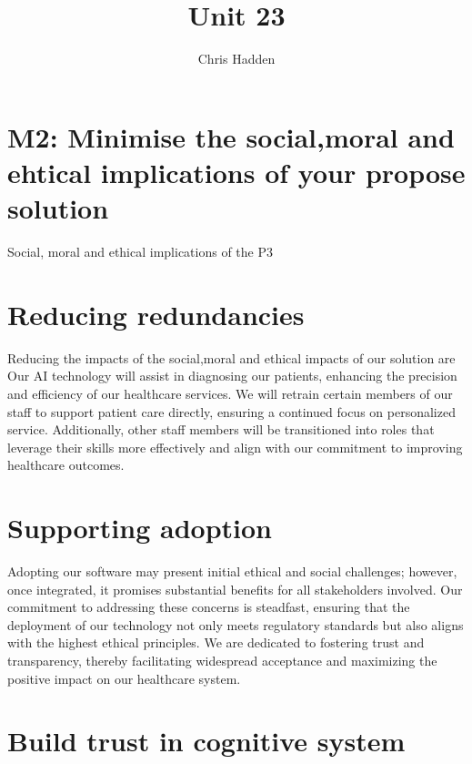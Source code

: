 \documentclass{article}
\title{Unit 23}
\author{Chris Hadden}
\date{}
\begin{document}
\maketitle

\section{M2: Minimise the social,moral and ehtical implications of your propose solution}

Social, moral and ethical implications of the P3

\section{Reducing redundancies}
Reducing the impacts of the social,moral and ethical impacts of our solution are  
Our AI technology will assist in diagnosing our patients, enhancing the precision and efficiency of our healthcare services. We will retrain certain members of our staff to support patient care directly, ensuring a continued focus on personalized service. Additionally, other staff members will be transitioned into roles that leverage their skills more effectively and align with our commitment to improving healthcare outcomes.


\section{Supporting adoption}
Adopting our software may present initial ethical and social challenges; however, once integrated, it promises substantial benefits for all stakeholders involved. Our commitment to addressing these concerns is steadfast, ensuring that the deployment of our technology not only meets regulatory standards but also aligns with the highest ethical principles. We are dedicated to fostering trust and transparency, thereby facilitating widespread acceptance and maximizing the positive impact on our healthcare system.

\section{Build trust in cognitive system}
\end{document}
